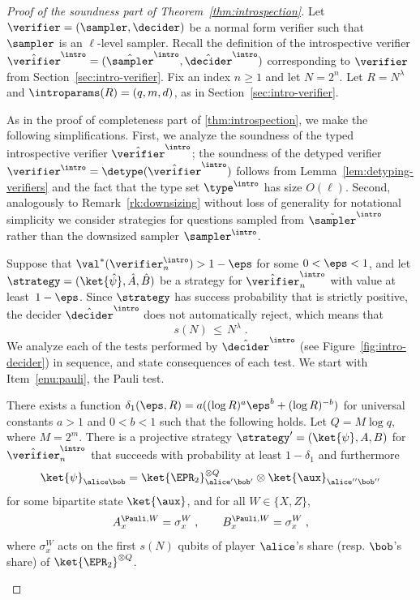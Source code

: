 \begin{proof}[Proof of the soundness part of Theorem~\ref{thm:introspection}]
  Let $\verifier=(\sampler, \decider)$ be a normal form verifier such that
  $\sampler$ is an $\ell$-level sampler.
  Recall the definition of the introspective verifier $\tvint =
  (\tsint, \tdint)$ corresponding to $\verifier$ from
  Section~\ref{sec:intro-verifier}.
  Fix an index $n\geq 1$ and let $N = 2^n$.
  Let $R = N^\lambda$ and $\introparams(R) = (q,m,d)$,
  as in Section~\ref{sec:intro-verifier}.
 
  As in the proof of completeness part of \cref{thm:introspection}, we make the
  following simplifications.
  First, we analyze the soundness of the typed introspective verifier
  $\tvint$; the soundness of the detyped verifier
  $\vint = \detype(\tvint)$ follows from Lemma~\ref{lem:detyping-verifiers}
  and the fact that the type set $\type^\intro$ has size $O(\ell)$.
  Second, analogously to Remark~\ref{rk:downsizing} without loss of generality
  for notational simplicity we consider strategies for questions sampled from
  $\tilde{\sampler}^\intro$ rather than the downsized sampler
  ${\sampler}^\intro$.

  Suppose that $\val^*(\verifier_n^\intro) > 1-\eps$ for some $0 < \eps < 1$,
  and let $\strategy = (\ket{\hat{\psi}}, \hat{A}, \hat{B})$ be a strategy for
  $\tvint_n$ with value at least~$1-\eps$.
  Since $\strategy$ has success probability that is strictly positive, the
  decider $\tdint$ does not automatically reject, which means that
	\begin{equation}\label{eq:intro-sound-lambda}
	s(N) \,\leq\, N^\lambda\;.
	\end{equation}
	We analyze each of the tests performed by $\tdint$ (see
  Figure~\ref{fig:intro-decider}) in sequence, and state consequences of each
  test.
  We start with Item~\ref{enu:pauli}, the Pauli test.
	
  \begin{lemma}\label{lem:intro-pauli-strat}
    There exists a function $\delta_1(\eps,R) = a( (\log R)^a \eps^{b} + (\log R)^{-b})$ for universal constants $a > 1$ and $0 < b < 1$ such that the following holds.
    Let $Q = M \log q$, where $M=2^m$.
    There is a projective strategy $\strategy'=(\ket{\psi},A,B)$ for
    $\tvint_n$ that succeeds with probability at least $1-\delta_1$
    and furthermore
    \begin{equation}
      \label{eq:intro-state-a}
      \ket{\psi}_{\alice\bob} =  \ket{\EPR_2}_{\alice'\bob'}^{\otimes Q} \otimes
      \ket{\aux}_{\alice''\bob''}
    \end{equation}
    for some  bipartite state $\ket{\aux}$, and for all $W\in\{X,Z\}$,
    \begin{equation}\label{eq:intro-sound-paulia}
      A^{\Pauli,W}_x = \sigma^W_x \;,\qquad B^{\Pauli,W}_x = \sigma^W_x \;,
    \end{equation}
    where $\sigma^W_x$ acts on the first $s(N)$ qubits of player $\alice$'s
    share (resp.
    $\bob$'s share) of $\ket{\EPR_2}^{\otimes Q}$.
  \end{lemma}
	

\end{proof}
